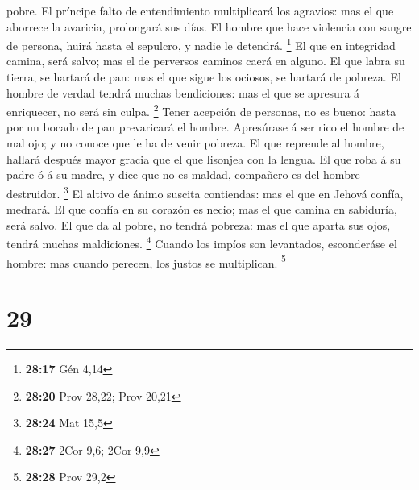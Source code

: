 pobre.  El príncipe falto de entendimiento multiplicará
los agravios: mas el que aborrece la avaricia, prolongará sus días.
 El hombre que hace violencia con sangre de persona,
huirá hasta el sepulcro, y nadie le detendrá. \footnote{\textbf{28:17}
  Gén 4,14}  El que en integridad camina, será salvo; mas
el de perversos caminos caerá en alguno.  El que labra su
tierra, se hartará de pan: mas el que sigue los ociosos, se hartará de
pobreza.  El hombre de verdad tendrá muchas bendiciones:
mas el que se apresura á enriquecer, no será sin culpa. \footnote{\textbf{28:20}
  Prov 28,22; Prov 20,21}  Tener acepción de personas, no
es bueno: hasta por un bocado de pan prevaricará el hombre.
 Apresúrase á ser rico el hombre de mal ojo; y no conoce
que le ha de venir pobreza.  El que reprende al hombre,
hallará después mayor gracia que el que lisonjea con la lengua.
 El que roba á su padre ó á su madre, y dice que no es
maldad, compañero es del hombre destruidor. \footnote{\textbf{28:24} Mat
  15,5}  El altivo de ánimo suscita contiendas: mas el
que en Jehová confía, medrará.  El que confía en su
corazón es necio; mas el que camina en sabiduría, será salvo.
 El que da al pobre, no tendrá pobreza: mas el que aparta
sus ojos, tendrá muchas maldiciones. \footnote{\textbf{28:27} 2Cor 9,6;
  2Cor 9,9}  Cuando los impíos son levantados,
esconderáse el hombre: mas cuando perecen, los justos se multiplican.
\footnote{\textbf{28:28} Prov 29,2}

\hypertarget{section-28}{%
\section{29}\label{section-28}}

